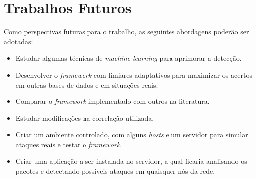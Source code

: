 \section{Trabalhos Futuros}
Como perspectivas futuras para o trabalho, as seguintes abordagens poderão ser adotadas:
\begin{itemize}
	\item Estudar algumas técnicas de \textit{machine learning} para aprimorar a detecção.
	\item Desenvolver o \textit{framework} com limiares adaptativos para maximizar os acertos em outras bases de dados e em situações reais.
	\item Comparar o \textit{framework} implementado com outros na literatura.
	\item Estudar modificações na correlação utilizada.
	\item Criar um ambiente controlado, com alguns \textit{hosts} e um servidor para simular ataques reais e testar o \textit{framework}.
	\item Criar uma aplicação a ser instalada no servidor, a qual ficaria analisando os pacotes e detectando possíveis ataques em quaisquer nós da rede.
\end{itemize}
